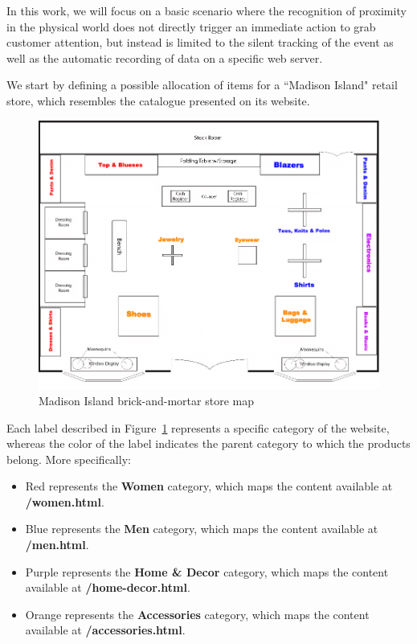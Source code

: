 In this work, we will focus on a basic scenario where the recognition of proximity in the physical world does not directly trigger an immediate action to grab customer attention, but instead is limited to the silent tracking of the event as well as the automatic recording of data on a specific web server.

We start by defining a possible allocation of items for a ``Madison Island" retail store, which resembles the catalogue presented on its website.

\vspace{0.5cm}
\begin{figure}[H]
  \centering
    \includegraphics[width=15cm]{images/madison/retail-map.jpg}
  \caption{Madison Island brick-and-mortar store map}
  \label{fig:retail-map}
\end{figure}
\vspace{0.5cm}

Each label described in Figure~\ref{fig:retail-map} represents a specific category of the website, whereas the color of the label indicates the parent category to which the products belong. More specifically:

\begin{itemize}
  \item Red represents the \textbf{Women} category, which maps the content available at \textbf{/women.html}. 
  \item Blue represents the \textbf{Men} category, which maps the content available at \textbf{/men.html}.
  \item Purple represents the \textbf{Home \& Decor} category, which maps the content available at \textbf{/home-decor.html}. 
  \item Orange represents the \textbf{Accessories} category, which maps the content available at \textbf{/accessories.html}. 
\end{itemize}

